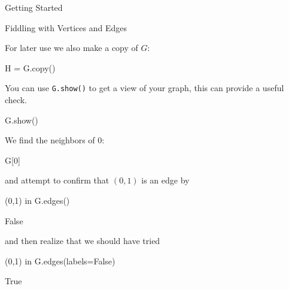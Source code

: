 \begin{chap}{Getting Started}
\begin{sect}{Fiddling with Vertices and Edges}
\begin{sagecode}
\end{sagecode}
%
\begin{para}
For later use we also make a copy of $G$:
\end{para}
%
\begin{sagecode}
\begin{sageinput}
H = G.copy()
\end{sageinput}
\begin{sageoutput}
\end{sageoutput}
\end{sagecode}
%
\begin{para}
You can use \verb|G.show()| to get a view of your graph, this can provide
a useful check.
\end{para}
%
%
\begin{sagecode}
\begin{sageinput}
G.show()
\end{sageinput}
\begin{sageoutput}
\end{sageoutput}
\end{sagecode}
%
\begin{para}
We find the neighbors of 0:
\end{para}
%
\begin{sagecode}
\begin{sageinput}
G[0]
\end{sageinput}
\begin{sageoutput}
[8, 1, 2, 7]
\end{sageoutput}
\end{sagecode}
%
\begin{para}    
and attempt to confirm that $(0,1)$ is an edge by
\end{para}
%
\begin{sagecode}
\begin{sageinput}
(0,1) in G.edges()
\end{sageinput}
\begin{sageoutput}
False
\end{sageoutput}
\end{sagecode}
%
\begin{para}
and then realize that we should have tried
\end{para}
%
%
\begin{sagecode}
\begin{sageinput}
(0,1) in G.edges(labels=False)
\end{sageinput}
\begin{sageoutput}
True
\end{sageoutput}

\end{sagecode}
\end{sect}
\end{chap}
